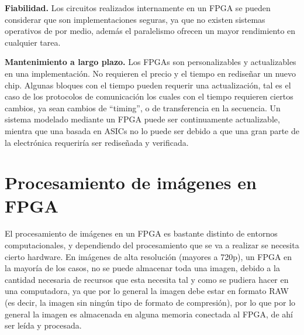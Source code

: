 \documentclass[twoside,spanish,ESP,MSc]{plantillaLabUPV}
\theoremstyle{definition}
\newcommand{\f}{FPGA }
\newcommand{\fs}{FPGAs }
\begin{document}
\checkmark\textbf{Fiabilidad.} Los circuitos realizados internamente en un \f se pueden considerar que son implementaciones seguras, ya que no existen sistemas operativos de por medio, además el paralelismo ofrecen un mayor rendimiento en cualquier tarea. 

\checkmark\textbf{Mantenimiento a largo plazo.} Los \fs son personalizables y actualizables en una implementación. No requieren el precio y el tiempo en rediseñar un nuevo chip. Algunas bloques con el tiempo pueden requerir una actualización, tal es el caso de los protocolos de comunicación los cuales con el tiempo requieren ciertos cambios, ya sean cambios de ``timing'', o de transferencia en la secuencia. Un sistema modelado mediante un FPGA puede ser continuamente actualizable, mientra que una basada en ASICs no lo puede ser debido a que una gran parte de la electrónica requeriría ser rediseñada y verificada. 



\section{Procesamiento de imágenes en FPGA}

El procesamiento de imágenes en un FPGA es bastante distinto de entornos computacionales, y dependiendo del procesamiento que se va a realizar se necesita cierto hardware. En imágenes de alta resolución (mayores a 720p), un FPGA en la mayoría de los casos, no se puede almacenar toda una imagen, debido a la cantidad necesaria de recursos que esta necesita tal y como se pudiera hacer en una computadora, ya que por lo general la imagen debe estar en formato RAW (es decir, la imagen sin ningún tipo de formato de compresión), por lo que por lo general la imagen es almacenada en alguna memoria conectada al FPGA, de ahí ser leída y procesada.
\end{document}

